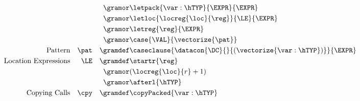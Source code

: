 \begin{displaymath}
\begin{aligned}
    && && \gramor & \letpack{\var:\hTYP}{\EXPR}{\EXPR} \\
    && && \gramor & \letloc{\locreg{\loc}{\reg}}{\LE}{\EXPR} \\
    && && \gramor & \letreg{\reg}{\EXPR} \\
    && && \gramor & \case{\VAL}{\vectorize{\pat}} \\
    \textup{Pattern} && \pat && \gramdef &
    \caseclause{\datacon{\DC}{}{(\vectorize{\var : \hTYP})}}{\EXPR} \\
    \textup{Location Expressions} && \LE && \gramdef
    & \startr{\reg} \\
    && && \gramor & (\locreg{\loc}{r} + 1) \\
    && && \gramor & \afterl{\hTYP}   \\        
    \textup{Copying Calls} && \cpy && \gramdef & \copyPacked{\var:\hTYP}
  \end{aligned}
\end{displaymath}
